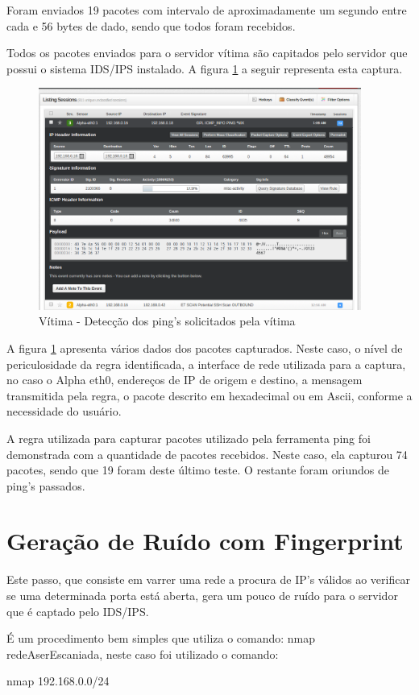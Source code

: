 Foram enviados 19 pacotes com intervalo de aproximadamente um segundo entre cada e
56 bytes de dado, sendo que todos foram recebidos.

 Todos os pacotes enviados para o servidor vítima são capitados pelo servidor
 que possui o sistema IDS/IPS instalado. A figura \ref{fig:ping_servidor} a seguir representa
 esta captura.

	\begin{figure}[h]
	 \centering
	 \includegraphics[width=400px, scale=1]{resource/ping_servidor}
	 \caption{Vítima - Detecção dos ping's solicitados pela vítima}
 \label{fig:ping_servidor}
 \end{figure}

 A figura \ref{fig:ping_servidor} apresenta vários dados dos pacotes capturados.
 Neste caso, o nível de periculosidade da regra identificada, a interface de rede
 utilizada para a captura, no caso o Alpha eth0, endereços de IP de origem e destino,
 a mensagem transmitida pela regra, o pacote descrito em hexadecimal ou em
 Ascii, conforme a necessidade do usuário.

 A regra utilizada para capturar pacotes utilizado pela ferramenta ping
 foi demonstrada com a quantidade de pacotes recebidos. Neste caso, ela capturou
 74 pacotes, sendo que 19 foram deste último teste. O restante foram oriundos de ping's
 passados.

 \section{Geração de Ruído com Fingerprint}
Este passo, que consiste em varrer uma rede a procura de IP's válidos ao verificar
se uma determinada porta está aberta, gera um pouco de ruído para o servidor que é
captado pelo IDS/IPS.

É um procedimento bem simples que utiliza o comando: nmap redeAserEscaniada, neste
caso foi utilizado o comando:
\begin{framed}
 nmap 192.168.0.0/24
\end{framed}

